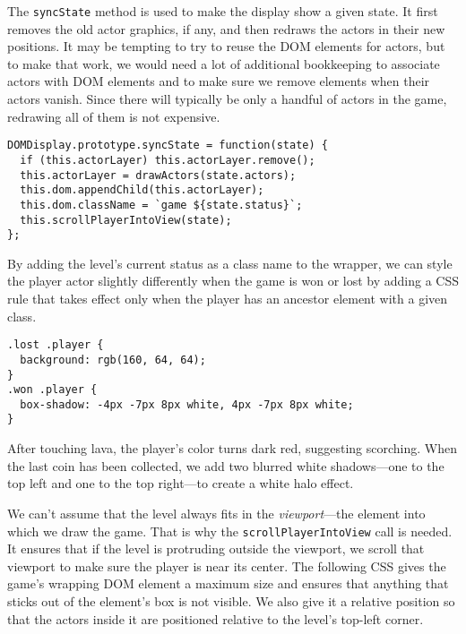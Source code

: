 The \lstinline`syncState` method is used to make the display show a given state. It first removes the old actor graphics, if any, and then redraws the actors in their new positions. It may be tempting to try to reuse the DOM elements for actors, but to make that work, we would need a lot of additional bookkeeping to associate actors with DOM elements and to make sure we remove elements when their actors vanish. Since there will typically be only a handful of actors in the game, redrawing all of them is not expensive.

\begin{lstlisting}
DOMDisplay.prototype.syncState = function(state) {
  if (this.actorLayer) this.actorLayer.remove();
  this.actorLayer = drawActors(state.actors);
  this.dom.appendChild(this.actorLayer);
  this.dom.className = `game ${state.status}`;
  this.scrollPlayerIntoView(state);
};
\end{lstlisting}
\noindent{}

By adding the level's current status as a class name to the wrapper, we can style the player actor slightly differently when the game is won or lost by adding a CSS rule that takes effect only when the player has an ancestor element with a given class.

\begin{lstlisting}
.lost .player {
  background: rgb(160, 64, 64);
}
.won .player {
  box-shadow: -4px -7px 8px white, 4px -7px 8px white;
}
\end{lstlisting}
\noindent{}

After touching lava, the player's color turns dark red, suggesting scorching. When the last coin has been collected, we add two blurred white shadows—one to the top left and one to the top right—to create a white halo effect.

\label{game.viewport}We can't assume that the level always fits in the \emph{viewport}—the element into which we draw the game. That is why the \lstinline`scrollPlayerIntoView` call is needed. It ensures that if the level is protruding outside the viewport, we scroll that viewport to make sure the player is near its center. The following CSS gives the game's wrapping DOM element a maximum size and ensures that anything that sticks out of the element's box is not visible. We also give it a relative position so that the actors inside it are positioned relative to the level's top-left corner.

